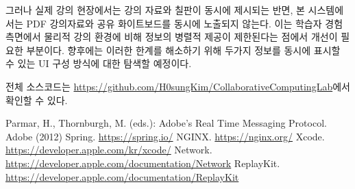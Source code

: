 \documentclass[10pt, a4paper, oneside]{article}
\begin{document}
그러나 실제 강의 현장에서는 강의 자료와 칠판이 동시에 제시되는 반면, 본 시스템에서는 PDF 강의자료와 공유 화이트보드를 동시에 노출되지 않는다. 이는 학습자 경험 측면에서 물리적 강의 환경에 비해 정보의 병렬적 제공이 제한된다는 점에서 개선이 필요한 부분이다. 향후에는 이러한 한계를 해소하기 위해 두가지 정보를 동시에 표시할 수 있는 UI 구성 방식에 대한 탐색할 예정이다.

전체 소스코드는 \href{https://github.com/H0sungKim/CollaborativeComputingLab}{https://github.com/H0sungKim/CollaborativeComputingLab}에서 확인할 수 있다.

\begin{thebibliography}{1}
Parmar, H., Thornburgh, M. (eds.): Adobe's Real Time Messaging Protocol. Adobe (2012)
Spring. \href{https://spring.io/}{https://spring.io/}
NGINX. \href{https://nginx.org/}{https://nginx.org/}
Xcode. \href{https://developer.apple.com/kr/xcode/}{https://developer.apple.com/kr/xcode/}
Network. \href{https://developer.apple.com/documentation/Network}{https://developer.apple.com/documentation/Network}
ReplayKit. \href{https://developer.apple.com/documentation/ReplayKit}{https://developer.apple.com/documentation/ReplayKit}
\end{thebibliography}
\end{document}
